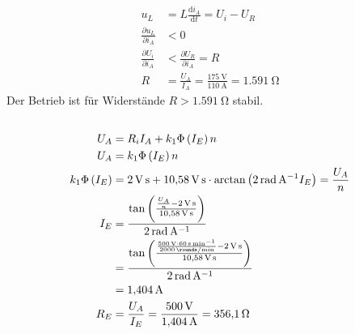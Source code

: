 \documentclass[11pt,a4paper]{scrartcl}
\newcommand{\mybr}[1]{\left(#1\right)}
\newcommand{\0}{_{\mybr{0}}}
\newcommand{\1}{_{\mybr{1}}}
\newcommand{\2}{_{\mybr{2}}}
\renewcommand{\d}{\mathrm{d}}
\begin{document}
\subsection{}
\begin{align}
u_L&=L\frac{\d i_A}{\d t}=U_i-U_R\\
\frac{\partial u_L}{\partial i_A}&<0\\
\frac{\partial U_i}{\partial i_A}&<\frac{\partial U_R}{\partial i_A}=R\\
R&=\frac{U_A}{I_A}=\frac{\SI{175}{\volt}}{\SI{110}{\ampere}}=\SI{1.591}{\ohm}
\end{align}
Der Betrieb ist für Widerstände $R>\SI{1.591}{\ohm}$ stabil.

\subsection{}
\begin{align}
U_A&=R_i I_A+k_1\Phi\mybr{I_E}n\\
U_A&=k_1\Phi\mybr{I_E}n\\
k_1\Phi\mybr{I_E}&=\SI{2}{\volt\second}+\SI{10.58}{\volt\second}\cdot\arctan\mybr{\SI{2}{\radian\per\ampere}I_E}=\frac{U_A}{n}\\
I_E&=\frac{\tan\mybr{\frac{\frac{U_A}{n}-\SI{2}{\volt\second}}{\SI{10.58}{\volt\second}}}}{\SI{2}{\radian\per\ampere}}\\
&=\frac{\tan\mybr{\frac{\frac{\SI{500}{\volt}\cdot\SI{60}{\second\per\minute}}{\SI{2000}{\rounds\per\minute}}-\SI{2}{\volt\second}}{\SI{10.58}{\volt\second}}}}{\SI{2}{\radian\per\ampere}}\\
&=\SI{1.404}{\ampere}\\
R_E&=\frac{U_A}{I_E}=\frac{\SI{500}{\volt}}{\SI{1.404}{\ampere}}=\SI{356.1}{\ohm}
\end{align}
\end{document}
